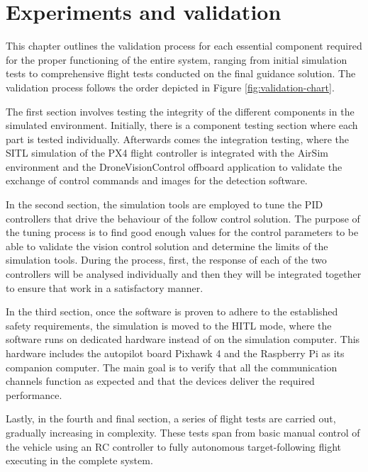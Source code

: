 \chapter{Experiments and validation}
\label{chap:validation}

This chapter outlines the validation process for each essential component required for the proper functioning of the entire system, ranging from initial simulation tests to comprehensive flight tests conducted on the final guidance solution. The validation process follows the order depicted in Figure \ref{fig:validation-chart}.

The first section involves testing the integrity of the different components in the simulated environment. Initially, there is a component testing section where each part is tested individually. Afterwards comes the integration testing, where the SITL simulation of the PX4 flight controller is integrated with the AirSim environment and the DroneVisionControl offboard application to validate the exchange of control commands and images for the detection software.

In the second section, the simulation tools are employed to tune the PID controllers that drive the behaviour of the follow control solution. The purpose of the tuning process is to find good enough values for the control parameters to be able to validate the vision control solution and determine the limits of the simulation tools. During the process, first, the response of each of the two controllers will be analysed individually and then they will be integrated together to ensure that work in a satisfactory manner.

In the third section, once the software is proven to adhere to the established safety requirements, the simulation is moved to the HITL mode, where the software runs on dedicated hardware instead of on the simulation computer. This hardware includes the autopilot board Pixhawk 4 and the Raspberry Pi as its companion computer. The main goal is to verify that all the communication channels function as expected and that the devices deliver the required performance.

Lastly, in the fourth and final section, a series of flight tests are carried out, gradually increasing in complexity. These tests span from basic manual control of the vehicle using an RC controller to fully autonomous target-following flight executing in the complete system.

